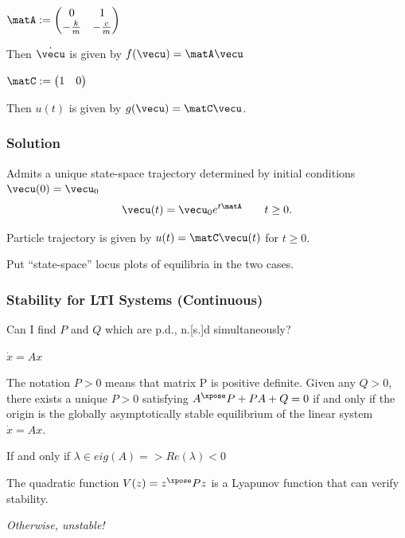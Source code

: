 \documentclass[12pt]{beamer}
\begin{document}
\begin{frame}

\begin{itemize}

\vitem
$\matA := \begin{pmatrix} 0 & 1 \\ -\frac{k}{m} & -\frac{c}{m} \end{pmatrix}$

\vitem
Then $\dot\vecu$ is given by $f(\vecu) = \matA \vecu$

\vitem $\matC := \begin{pmatrix} 1 & 0 \end{pmatrix}$

\vitem
Then $u(t)$ is given by
$g(\vecu) = \matC \vecu$.

\end{itemize}
\vfill\null

\end{frame}


\begin{frame}
\frametitle{Solution}

\begin{itemize}

\vitem Admits a unique state-space trajectory determined by initial conditions $\vecu(0) = \vecu_0$
\[
  \vecu(t) = \vecu_0 e^{t \matA }
  \qquad t \geq 0.
\]

\vitem Particle trajectory is given by $u(t) = \matC \vecu(t)$ for $t \geq 0$.

\end{itemize}
\vfill\null

\end{frame}




\begin{frame}
Put ``state-space'' locus plots of equilibria in the two cases.
\end{frame}





\begin{frame}
\frametitle{Stability for LTI Systems (Continuous)}


Can I find $P$ and $Q$ which are p.d., n.[s.]d simultaneously?

$\dot x = Ax$

The notation $P > 0$ means that matrix P is positive definite.
Given any $Q > 0$, there exists a unique $P > 0$ satisfying 
$A^\xpose P + P A + Q = 0$ if and only if the origin is the globally asymptotically stable equilibrium of the linear system $\dot x = A x$.

If and only if $\lambda \in eig(A) => Re(\lambda) < 0$

The quadratic function $V(z) = z^\xpose P z$ is a Lyapunov function that can verify stability.

\emph{Otherwise, unstable!}

\end{frame}
\end{document}
